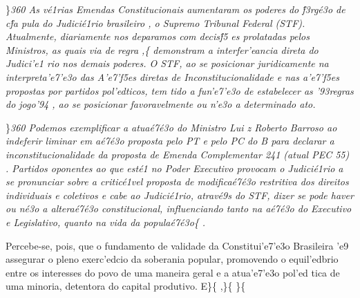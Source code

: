  \ltrch{} 
\par \}\pard \ltrpar\qj {}\sl360\widctlpar\wrapdefault\faauto{} {\rtlch{}  \ltrch{}  As v\'e1rias Emendas Constitucionais aumentaram os poderes do \'f3rg\'e3o de c\'fa
pula do Judici\'e1rio}{\rtlch{}  \ltrch{}   brasileiro}{\rtlch{}  \ltrch{}  , o Supremo Tribunal Federal (STF). Atualmente, diariamente nos deparamos com decis\'f5
es prolatadas pelos Ministros, as quais via de regra}{\rtlch{}  \ltrch{}  ,}\{\rtlch{}
 \ltrch{}  demonstram a
interfer'eancia direta do Judici'e1 rio nos demais poderes. O STF, ao se
posicionar juridicamente na interpreta'e7'e3o das A'e7'f5es diretas de
Inconstitucionalidade e nas a'e7'f5es propostas por partidos
pol'edticos, tem tido a fun'e7'e3o de estabelecer as '93regras do
jogo'94 , ao se posicionar favoravelmente ou n'e3o a determinado ato.
\par \}\pard \ltrpar\qj {}\sl360\widctlpar\wrapdefault\faauto{} {\rtlch{}  \ltrch{}  \tab Podemos exemplificar a atua\'e7\'e3o do Ministro Lui
z Roberto Barroso ao indeferir liminar em a\'e7\'e3o proposta pelo PT e pelo PC do B para declarar a inconstitucionalidade da proposta de Emenda Complementar 241}{\rtlch{}  \ltrch{}   (atual PEC 55)}{\rtlch{}  \ltrch{} 
 . Partidos oponentes ao que est\'e1 no Poder Executivo provocam o Judici\'e1rio a se pronunciar sobre a critic\'e1vel proposta de modifica\'e7\'e3o restritiva dos direitos individuais e coletivos}{\rtlch{}  
\ltrch{}   e cabe ao Judici\'e1rio, atrav\'e9s do STF, dizer se pode haver ou n\'e3o a altera\'e7\'e3o constitucional, influenciando tanto na a\'e7\'e3o do Executivo e Legislativo, quanto na vida da popula\'e7\'e3o}\{\rtlch{}
 \ltrch{}  .
\par \tab Percebe-se, pois, que o fundamento de validade da
Constitui'e7'e3o Brasileira 'e9 assegurar o pleno exerc'edcio da
soberania popular, promovendo o equil'edbrio entre os interesses do povo
de uma maneira geral e a atua'e7'e3o pol'ed tica de uma minoria,
detentora do capital produtivo. E\}\{\rtlch{}  \ltrch{}
 ,\}\{\rtlch{}  \ltrch{}
 \}\{\rtlch{}  \ltrch{}

